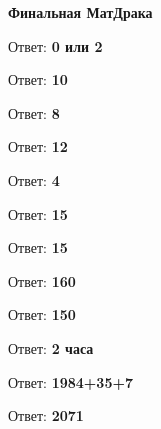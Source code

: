 \centerline{\bf \Huge Финальная МатДрака}

 Ответ: \textbf{0 или 2}

 Ответ: \textbf{10}

 Ответ: \textbf{8}

 Ответ: \textbf{12}

 Ответ: \textbf{4}

 Ответ: \textbf{15}

 Ответ: \textbf{15}

 Ответ: \textbf{160}

 Ответ: \textbf{150}

 Ответ: \textbf{2 часа}

 Ответ: \textbf{1984+35+7}

 Ответ: \textbf{2071}



